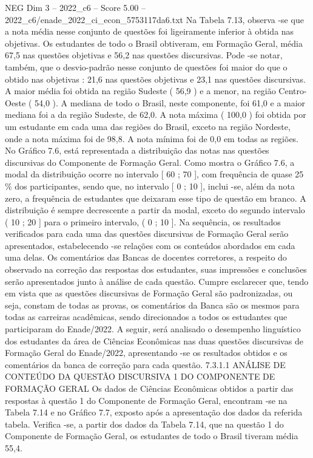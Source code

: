 \begin{textsample}{NEG Dim 3 – 2022\_c6 – Score 5.00 – 2022\_c6/enade\_2022\_ci\_econ\_5753117da6.txt}
Na Tabela 7.13, observa -se que a nota média nesse conjunto de questões foi ligeiramente inferior à obtida nas objetivas.
Os estudantes de todo o Brasil obtiveram, em Formação Geral, média 67,5 nas questões objetivas e 56,2 nas questões discursivas.
Pode -se notar, também, que o desvio-padrão nesse conjunto de questões foi maior do que o obtido nas objetivas : 21,6 nas questões objetivas e 23,1 nas questões discursivas.
A maior média foi obtida na região Sudeste ( 56,9 ) e a menor, na região Centro-Oeste ( 54,0 ).
A mediana de todo o Brasil, neste componente, foi 61,0 e a maior mediana foi a da região Sudeste, de 62,0.
A nota máxima ( 100,0 ) foi obtida por um estudante em cada uma das regiões do Brasil, exceto na região Nordeste, onde a nota máxima foi de 98,8.
A nota mínima foi de 0,0 em todas as regiões.
No Gráfico 7.6, está representada a distribuição das notas nas questões discursivas do Componente de Formação Geral.
Como mostra o Gráfico 7.6, a modal da distribuição ocorre no intervalo [ 60 ; 70 ], com frequência de quase 25 \% dos participantes, sendo que, no intervalo [ 0 ; 10 ], inclui -se, além da nota zero, a frequência de estudantes que deixaram esse tipo de questão em branco.
A distribuição é sempre decrescente a partir da modal, exceto do segundo intervalo ( 10 ; 20 ] para o primeiro intervalo, ( 0 ; 10 ].
Na sequência, os resultados verificados para cada uma das questões discursivas de Formação Geral serão apresentados, estabelecendo -se relações com os conteúdos abordados em cada uma delas.
Os comentários das Bancas de docentes corretores, a respeito do observado na correção das respostas dos estudantes, suas impressões e conclusões serão apresentados junto à análise de cada questão.
Cumpre esclarecer que, tendo em vista que as questões discursivas de Formação Geral são padronizadas, ou seja, constam de todas as provas, os comentários da Banca são os mesmos para todas as carreiras acadêmicas, sendo direcionados a todos os estudantes que participaram do Enade/2022.
A seguir, será analisado o desempenho linguístico dos estudantes da área de Ciências Econômicas nas duas questões discursivas de Formação Geral do Enade/2022, apresentando -se os resultados obtidos e os comentários da banca de correção para cada questão. 7.3.1.1 ANÁLISE DE CONTEÚDO DA QUESTÃO DISCURSIVA 1 DO COMPONENTE DE FORMAÇÃO GERAL Os dados de Ciências Econômicas obtidos a partir das respostas à questão 1 do Componente de Formação Geral, encontram -se na Tabela 7.14 e no Gráfico 7.7, exposto após a apresentação dos dados da referida tabela.
Verifica -se, a partir dos dados da Tabela 7.14, que na questão 1 do Componente de Formação Geral, os estudantes de todo o Brasil tiveram média 55,4.

\end{textsample}
